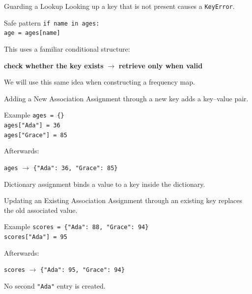 \documentclass[aspectratio=169,10pt]{beamer}
\begin{document}
\begin{frame}{Guarding a Lookup}
  Looking up a key that is not present causes a \texttt{KeyError}.

  \begin{block}{Safe pattern}
    \texttt{if name in ages:}\\
    \hspace{0.20in}\texttt{age = ages[name]}
  \end{block}

  This uses a familiar conditional structure:

  \begin{center}
    \textbf{check whether the key exists} $\longrightarrow$ \textbf{retrieve only when valid}
  \end{center}

  We will use this same idea when constructing a frequency map.
\end{frame}

\begin{frame}{Adding a New Association}
  Assignment through a new key adds a key--value pair.

  \begin{block}{Example}
    \texttt{ages = \{\}}\\
    \texttt{ages["Ada"] = 36}\\
    \texttt{ages["Grace"] = 85}
  \end{block}

  Afterwards:

  \begin{center}
    \texttt{ages} $\rightarrow$ \texttt{\{"Ada": 36, "Grace": 85\}}
  \end{center}

  \begin{keyidea}
    Dictionary assignment binds a value to a key inside the dictionary.
  \end{keyidea}
\end{frame}

\begin{frame}{Updating an Existing Association}
  Assignment through an existing key replaces the old associated value.

  \begin{block}{Example}
    \texttt{scores = \{"Ada": 88, "Grace": 94\}}\\
    \texttt{scores["Ada"] = 95}
  \end{block}

  Afterwards:

  \begin{center}
    \texttt{scores} $\rightarrow$ \texttt{\{"Ada": 95, "Grace": 94\}}
  \end{center}

  No second \texttt{"Ada"} entry is created.
\end{frame}
\end{document}
